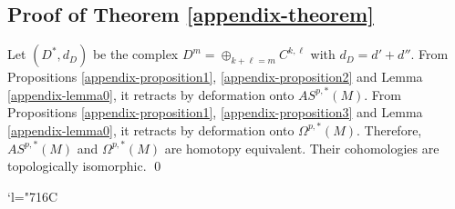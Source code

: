 \documentclass[JEP,XML,SOM,Unicode,published]{cedram}
\newcommand{\Changelback}{\mathcode`l="716C}
\theoremstyle{plain}
\theoremstyle{remark}
\theoremstyle{definition}
\begin{document}
\subsection{Proof of Theorem \ref{appendix-theorem}}
Let $(D^*, d_D)$ be the complex $D^m = \oplus_{k + \ell = m} C^{k, \ell}$ with $d_D = d' + d''$.
From Propositions \ref{appendix-proposition1}, \ref{appendix-proposition2} and Lemma \ref{appendix-lemma0}, it retracts by deformation
onto $AS^{p, *}(M)$. From Propositions \ref{appendix-proposition1}, \ref{appendix-proposition3} and Lemma \ref{appendix-lemma0},
it retracts by deformation onto $\Omega^{p, *}(M)$. Therefore, $AS^{p, *}(M)$ and $\Omega^{p, *}(M)$ are homotopy equivalent.
Their cohomologies are topologically isomorphic.
\qed

\Changelback
\backmatter


\end{document}
